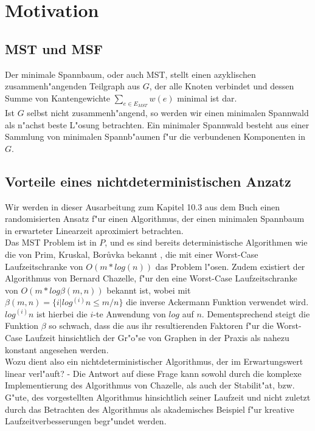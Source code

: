 \section{Motivation}

\subsection{MST und MSF}
Der minimale Spannbaum, oder auch MST, stellt einen azyklischen 
    zusammenh"angenden Teilgraph aus $G$, der alle Knoten verbindet und
    dessen Summe von Kantengewichte $\sum_{e \in E_{MST}} w(e)$
    minimal ist dar.\\
Ist $G$ selbst nicht zusammenh"angend, so werden wir einen minimalen Spannwald
    als n"achst beste L"osung betrachten.
    Ein minimaler Spannwald besteht aus einer Sammlung von minimalen 
    Spannb"aumen f"ur die verbundenen Komponenten in $G$.\\

\subsection{Vorteile eines nichtdeterministischen Anzatz}

Wir werden in dieser Ausarbeitung zum Kapitel 10.3 aus dem Buch
    \cite{randAlg}
    einen
    randomisierten Ansatz f"ur einen Algorithmus, der einen minimalen Spannbaum
    in erwarteter Linearzeit aproximiert betrachten.\\
Das MST Problem ist in $P$, und es sind bereits 
    deterministische Algorithmen wie die von
    Prim, Kruskal, Bor\r uvka bekannt
    , die mit einer Worst-Case Laufzeitschranke 
    von $O(m * log(n))$ das Problem l"osen.
    Zudem existiert der Algorithmus von Bernard Chazelle, f"ur den eine
    Worst-Case Laufzeitschranke von $O(m * log \beta(m,n))$ bekannt ist, wobei
    mit
    $\beta(m,n) = \{i | log^{(i)} n \leq m / n\}$ die inverse Ackermann Funktion
    verwendet wird. 
    $log^{(i)} n$ ist hierbei die $i$-te Anwendung von $log$ auf $n$.
    Dementsprechend steigt die Funktion $\beta$ so schwach, dass die
    aus ihr resultierenden Faktoren f"ur die Worst-Case Laufzeit hinsichtlich
    der Gr"o"se von Graphen in der Praxis als nahezu konstant angesehen werden.\\
Wozu dient also ein nichtdeterministischer Algorithmus, der im Erwartungswert 
    linear verl"auft?
    - Die Antwort auf diese Frage kann sowohl durch die komplexe Implementierung
    des Algorithmus von Chazelle, als auch der Stabilit"at, bzw. G"ute,
    des vorgestellten Algorithmus hinsichtlich seiner Laufzeit
    und nicht zuletzt durch das Betrachten des Algorithmus als akademisches
    Beispiel f"ur kreative Laufzeitverbesserungen begr"undet werden.\\
